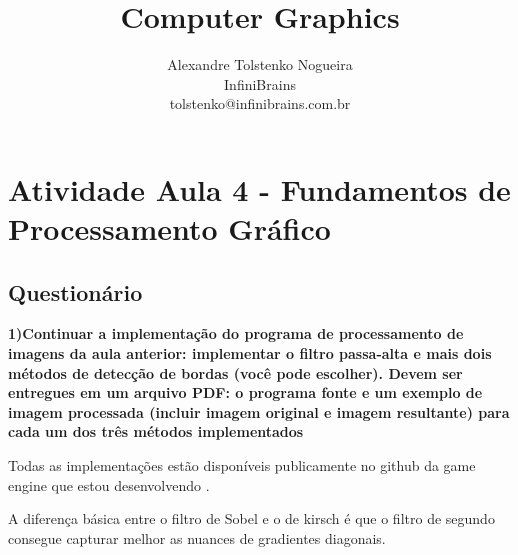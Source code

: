 \documentclass[a4paper]{sbgames}               %
\title{Computer Graphics}
\author{Alexandre Tolstenko Nogueira\\InfiniBrains\\tolstenko@infinibrains.com.br 
}
\begin{document}


\maketitle




\section{Atividade Aula 4 - Fundamentos de Processamento Gráfico}

\subsection*{Questionário}

\textbf{1)Continuar a implementação do programa de processamento de imagens da aula anterior: implementar o filtro passa-alta e mais dois métodos de detecção de bordas (você pode escolher). Devem ser entregues em um arquivo PDF: o programa fonte e um exemplo de imagem processada (incluir imagem original e imagem resultante) para
cada um dos três métodos implementados}

Todas as implementações estão disponíveis publicamente no github da game engine que estou desenvolvendo \cite{Tolstenko2018}.

A diferença básica entre o filtro de Sobel e o de kirsch é que o filtro de segundo consegue capturar melhor as nuances de gradientes diagonais.
\end{document}
